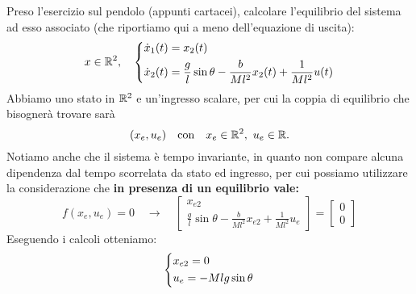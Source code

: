 \documentclass[a4paper]{report}
\begin{document}
\begin{esem}
	Preso l'esercizio sul pendolo (appunti cartacei), calcolare l'equilibrio del sistema ad esso associato (che riportiamo qui a meno dell'equazione di uscita):
	\begin{equation*}
	x \in \mathbb{R}^2, \quad
		\begin{dcases}
			\dot x_1(t) = x_2(t) \\
			\dot x_2(t) = \frac{g}{l}\sin\theta -\frac{b}{Ml^2}x_2(t)+\frac{1}{Ml^2}u(t)
		\end{dcases}
	\end{equation*}
	Abbiamo uno stato in $\mathbb{R}^2$ e un'ingresso scalare, per cui la coppia di equilibrio che bisognerà trovare sarà
	\begin{equation*}
		(x_e, u_e) \quad \textrm{con} \quad x_e \in \mathbb{R}^2, \ u_e \in \mathbb{R}.
	\end{equation*}
	 Notiamo anche che il sistema è tempo invariante, in quanto non compare alcuna dipendenza dal tempo scorrelata da stato ed ingresso, per cui possiamo utilizzare la considerazione che \textbf{in presenza di un equilibrio vale:}
	\begin{equation*}
		f(x_e,u_e) = 0 \quad \rightarrow \quad  \begin{bmatrix}
			x_{e2} \\ \frac{g}{l}\sin\theta -\frac{b}{Ml^2}x_{e2}+\frac{1}{Ml^2}u_e
		\end{bmatrix} = \begin{bmatrix}
			0 \\ 0
		\end{bmatrix}
	\end{equation*}
	Eseguendo i calcoli otteniamo:
	\begin{equation*}
		\begin{dcases}
			x_{e2} = 0 \\
			u_e = - Mlg\sin\theta 
		\end{dcases}
	\end{equation*}
\end{esem}
\end{document}
